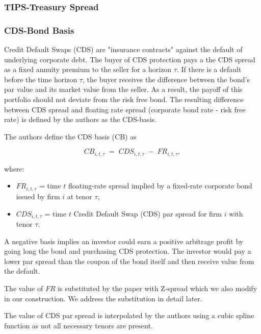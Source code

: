 \documentclass{article}
\begin{document}
\begin{appendices}
\subsubsection{TIPS-Treasury Spread}

\subsubsection{CDS-Bond Basis}

Credit Default Swaps (CDS) are "insurance contracts" against the default of underlying
corporate debt. The buyer of CDS protection pays a the CDS spread as a 
fixed annuity premium to the seller for a horizon $\tau$. If there is a default
before the time horizon $\tau$, the buyer receives the difference between
the bond's par value and its market value from the seller. 
As a result, the payoff of this portfolio should not deviate from the risk free bond. 
The resulting difference between CDS spread and floating rate spread (corporate bond rate - risk free rate)
is defined by the authors as the CDS-basis.

The authors define the CDS basis (CB) as

\begin{equation}
  CB_{i,t,\tau} \;=\; CDS_{i,t,\tau} \;-\; FR_{i,t,\tau},
\end{equation}

where:
\begin{itemize}
  \item $FR_{i,t,\tau}$ = time $t$ floating‐rate spread implied by a fixed‐rate corporate bond issued by firm $i$ at tenor $\tau$,
  \item $CDS_{i,t,\tau}$ = time $t$ Credit Default Swap (CDS) par spread for firm $i$ with tenor $\tau$.
\end{itemize}

A negative basis implies an investor could earn a positive arbitrage profit by going long the bond and purchasing CDS protection. 
The investor would pay a lower par spread than the coupon of the bond itself and then receive value from the default.

The value of $FR$ is substituted by the paper with Z‐spread which we also modify in our construction. We address the substitution in detail later.

The value of CDS par spread is interpolated by the authors using a cubic spline function as
not all necessary tenors are present.


\end{appendices}
\end{document}
